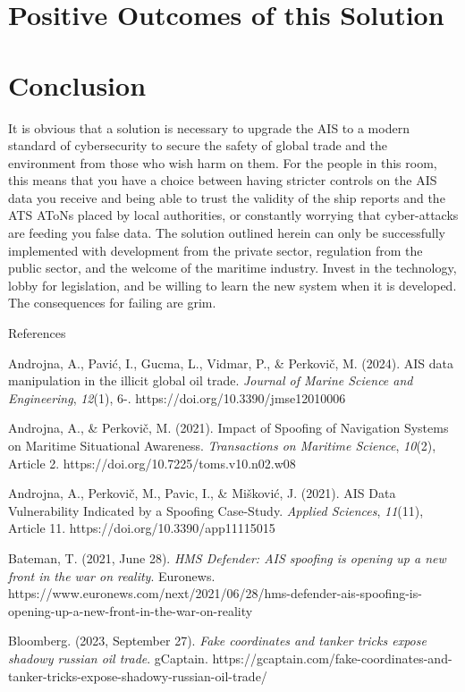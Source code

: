 \documentclass[
]{article}
\begin{document}
\hypertarget{positive-outcomes-of-this-solution}{%
\section{Positive Outcomes of this
Solution}\label{positive-outcomes-of-this-solution}}

\hypertarget{conclusion}{%
\section{Conclusion}\label{conclusion}}

It is obvious that a solution is necessary to upgrade the AIS to a
modern standard of cybersecurity to secure the safety of global trade
and the environment from those who wish harm on them. For the people in
this room, this means that you have a choice between having stricter
controls on the AIS data you receive and being able to trust the
validity of the ship reports and the ATS AToNs placed by local
authorities, or constantly worrying that cyber-attacks are feeding you
false data. The solution outlined herein can only be successfully
implemented with development from the private sector, regulation from
the public sector, and the welcome of the maritime industry. Invest in
the technology, lobby for legislation, and be willing to learn the new
system when it is developed. The consequences for failing are grim.

References

Androjna, A., Pavić, I., Gucma, L., Vidmar, P., \& Perkovič, M. (2024).
AIS data manipulation in the illicit global oil trade. \emph{Journal of
Marine Science and Engineering}, \emph{12}(1), 6-.
https://doi.org/10.3390/jmse12010006

Androjna, A., \& Perkovič, M. (2021). Impact of Spoofing of Navigation
Systems on Maritime Situational Awareness. \emph{Transactions on
Maritime Science}, \emph{10}(2), Article 2.
https://doi.org/10.7225/toms.v10.n02.w08

Androjna, A., Perkovič, M., Pavic, I., \& Mišković, J. (2021). AIS Data
Vulnerability Indicated by a Spoofing Case-Study. \emph{Applied
Sciences}, \emph{11}(11), Article 11.
https://doi.org/10.3390/app11115015

Bateman, T. (2021, June 28). \emph{HMS Defender: AIS spoofing is opening
up a new front in the war on reality}. Euronews.
https://www.euronews.com/next/2021/06/28/hms-defender-ais-spoofing-is-opening-up-a-new-front-in-the-war-on-reality

Bloomberg. (2023, September 27). \emph{Fake coordinates and tanker
tricks expose shadowy russian oil trade}. gCaptain.
https://gcaptain.com/fake-coordinates-and-tanker-tricks-expose-shadowy-russian-oil-trade/
\end{document}
